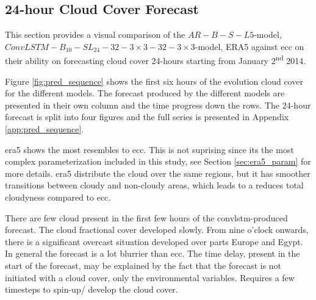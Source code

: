 \subsection{24-hour Cloud Cover Forecast}
This section provides a visual comparison of the $AR-B-S-L5$-model, $ConvLSTM-B_{10}-SL_{24}-32-3\times3-32-3 \times3$-model, ERA5 against \acrshort{ecc} on their ability on forecasting cloud cover 24-hours starting from January 2\textsuperscript{nd} 2014.

Figure \ref{fig:pred_sequence} shows the first six hours of the evolution cloud cover for the different models. The forecast produced by the different models are presented in their own column and the time progress down the rows. The 24-hour forecast is split into four figures and the full series is presented in Appendix \ref{app:pred_sequence}. 

\acrshort{era5} shows the most resembles to \acrshort{ecc}. This is not suprising since its the most complex parameterization included in this study, see Section \ref{sec:era5_param} for more details. \acrshort{era5} distribute the cloud over the same regions, but it has smoother transitions between cloudy and non-cloudy areas, which leads to a reduces total cloudyness compared to \acrshort{ecc}.

There are few cloud present in the first few hours of the \acrshort{convlstm}-produced forecast. The cloud fractional cover developed slowly. From nine o'clock onwards, there is a significant overcast situation developed over parts Europe and Egypt. In general the forecast is a lot blurrier than \acrshort{ecc}. The time delay, present in the start of the forecast, may be explained by the fact that the forecast is not initiated with a cloud cover, only the environmental variables. Requires a few timesteps to spin-up/ develop the cloud cover.

